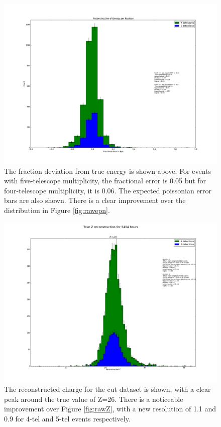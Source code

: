 \documentclass[11pt]{article}
\begin{document}
\begin{figure}
\begin{center}
\includegraphics[width=\textwidth]{epn}
\caption{The fraction deviation from true energy is shown above. For events with five-telescope multiplicity, the fractional error is 0.05 but for four-telescope multiplicity, it is 0.06. The expected poissonian error bars are also shown. There is a clear improvement over the distribution in Figure \ref{fig:rawepn}.}
\label{fig:epn}
\end{center}
\end{figure}  

\begin{figure}
\begin{center}
\includegraphics[width=\textwidth]{Z}
\caption{The reconstructed charge for the cut dataset is shown, with a clear peak around the true value of Z=26. There is a noticeable improvement over Figure \ref{fig:rawZ}, with a new resolution of 1.1 and 0.9 for 4-tel and 5-tel events respectively.}
\label{fig:Z}
\end{center}
\end{figure}
\end{document}
